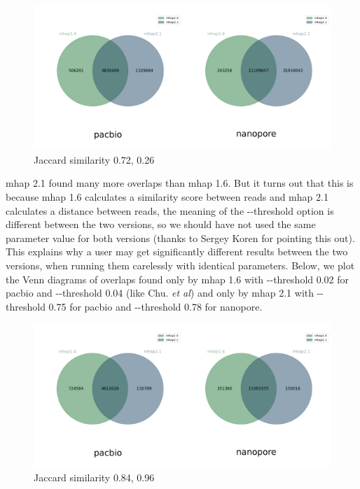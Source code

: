 \documentclass[./main.tex]{subfiles}
\begin{document}
\begin{figure}[ht]
\centering
\includegraphics[width=\textwidth]{paper/blog_post/mhap_venn_same.png}
\caption{Jaccard similarity 0.72, 0.26}
\end{figure}



mhap 2.1 found many more overlaps than mhap 1.6. But it turns out that
this is because mhap 1.6 calculates a similarity score between reads and
mhap 2.1 calculates a distance between reads, the meaning of the
-\/-threshold option is different between the two versions, so we should
have not used the same parameter value for both versions (thanks to
Sergey Koren for pointing this out). This explains why a user may get
significantly different results between the two versions, when running
them carelessly with identical parameters. Below, we plot the Venn
diagrams of overlaps found only by mhap 1.6 with -\/-threshold 0.02 for
pacbio and -\/-threshold 0.04 (like Chu. \emph{et al}) and only by mhap
2.1 with -\/-threshold 0.75 for pacbio and -\/-threshold 0.78 for
nanopore.

\begin{figure}[ht]
\centering
\includegraphics[width=\textwidth]{paper/blog_post/mhap_venn.png}
\caption{Jaccard similarity 0.84, 0.96}
\end{figure}
\end{document}
